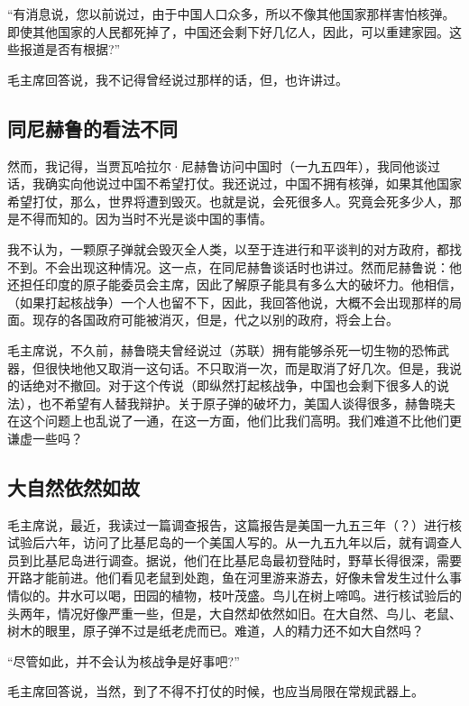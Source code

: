 “有消息说，您以前说过，由于中国人口众多，所以不像其他国家那样害怕核弹。即使其他国家的人民都死掉了，中国还会剩下好几亿人，因此，可以重建家园。这些报道是否有根据?”

毛主席回答说，我不记得曾经说过那样的话，但，也许讲过。

\subsection{同尼赫鲁的看法不同}

然而，我记得，当贾瓦哈拉尔·尼赫鲁访问中国时（一九五四年），我同他谈过话，我确实向他说过中国不希望打仗。我还说过，中国不拥有核弹，如果其他国家希望打仗，那么，世界将遭到毁灭。也就是说，会死很多人。究竟会死多少人，那是不得而知的。因为当时不光是谈中国的事情。

我不认为，一颗原子弹就会毁灭全人类，以至于连进行和平谈判的对方政府，都找不到。不会出现这种情况。这一点，在同尼赫鲁谈话时也讲过。然而尼赫鲁说：他还担任印度的原子能委员会主席，因此了解原子能具有多么大的破坏力。他相信，（如果打起核战争）一个人也留不下，因此，我回答他说，大概不会出现那样的局面。现存的各国政府可能被消灭，但是，代之以别的政府，将会上台。

毛主席说，不久前，赫鲁晓夫曾经说过（苏联）拥有能够杀死一切生物的恐怖武器，但很快地他又取消一这句话。不只取消一次，而是取消了好几次。但是，我说的话绝对不撤回。对于这个传说（即纵然打起核战争，中国也会剩下很多人的说法），也不希望有人替我辩护。关于原子弹的破坏力，美国人谈得很多，赫鲁晓夫在这个问题上也乱说了一通，在这一方面，他们比我们高明。我们难道不比他们更谦虚一些吗？

\subsection{大自然依然如故}

毛主席说，最近，我读过一篇调查报告，这篇报告是美国一九五三年（？）进行核试验后六年，访问了比基尼岛的一个美国人写的。从一九五九年以后，就有调查人员到比基尼岛进行调查。据说，他们在比基尼岛最初登陆时，野草长得很深，需要开路才能前进。他们看见老鼠到处跑，鱼在河里游来游去，好像未曾发生过什么事情似的。井水可以喝，田园的植物，枝叶茂盛。鸟儿在树上啼鸣。进行核试验后的头两年，情况好像严重一些，但是，大自然却依然如旧。在大自然、鸟儿、老鼠、树木的眼里，原子弹不过是纸老虎而已。难道，人的精力还不如大自然吗？

“尽管如此，并不会认为核战争是好事吧?”

毛主席回答说，当然，到了不得不打仗的时候，也应当局限在常规武器上。

